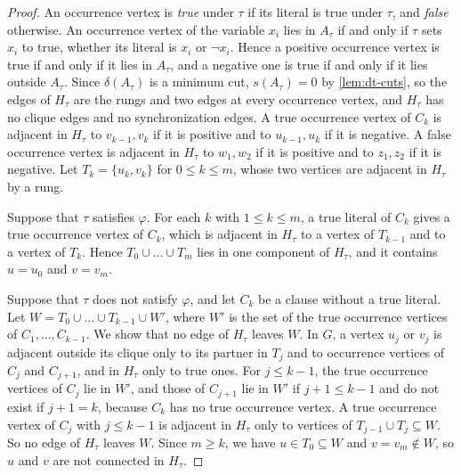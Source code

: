 \begin{proof}
An occurrence vertex is \emph{true} under $\tau$ if its literal is true under $\tau$, and \emph{false} otherwise.
An occurrence vertex of the variable $x_i$ lies in $A_\tau$ if and only if $\tau$ sets $x_i$ to true, whether its literal is $x_i$ or $\neg x_i$.
Hence a positive occurrence vertex is true if and only if it lies in $A_\tau$, and a negative one is true if and only if it lies outside $A_\tau$.
Since $\delta(A_\tau)$ is a minimum cut, $s(A_\tau) = 0$ by \cref{lem:dt-cuts}, so the edges of $H_\tau$ are the rungs and two edges at every occurrence vertex, and $H_\tau$ has no clique edges and no synchronization edges.
A true occurrence vertex of $C_k$ is adjacent in $H_\tau$ to $v_{k-1}, v_k$ if it is positive and to $u_{k-1}, u_k$ if it is negative.
A false occurrence vertex is adjacent in $H_\tau$ to $w_1, w_2$ if it is positive and to $z_1, z_2$ if it is negative.
Let $T_k = \{u_k, v_k\}$ for $0 \leq k \leq m$, whose two vertices are adjacent in $H_\tau$ by a rung.

Suppose that $\tau$ satisfies $\varphi$.
For each $k$ with $1 \leq k \leq m$, a true literal of $C_k$ gives a true occurrence vertex of $C_k$, which is adjacent in $H_\tau$ to a vertex of $T_{k-1}$ and to a vertex of $T_k$.
Hence $T_0 \cup \dots \cup T_m$ lies in one component of $H_\tau$, and it contains $u = u_0$ and $v = v_m$.

Suppose that $\tau$ does not satisfy $\varphi$, and let $C_k$ be a clause without a true literal.
Let $W = T_0 \cup \dots \cup T_{k-1} \cup W'$, where $W'$ is the set of the true occurrence vertices of $C_1, \dots, C_{k-1}$.
We show that no edge of $H_\tau$ leaves $W$.
In $G$, a vertex $u_j$ or $v_j$ is adjacent outside its clique only to its partner in $T_j$ and to occurrence vertices of $C_j$ and $C_{j+1}$, and in $H_\tau$ only to true ones.
For $j \leq k - 1$, the true occurrence vertices of $C_j$ lie in $W'$, and those of $C_{j+1}$ lie in $W'$ if $j + 1 \leq k - 1$ and do not exist if $j + 1 = k$, because $C_k$ has no true occurrence vertex.
A true occurrence vertex of $C_j$ with $j \leq k - 1$ is adjacent in $H_\tau$ only to vertices of $T_{j-1} \cup T_j \subseteq W$.
So no edge of $H_\tau$ leaves $W$.
Since $m \geq k$, we have $u \in T_0 \subseteq W$ and $v = v_m \notin W$, so $u$ and $v$ are not connected in $H_\tau$.
\end{proof}

